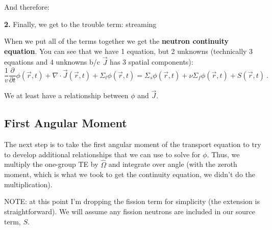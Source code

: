 \documentclass[12pt]{article}
\newif\ifeqns
\newlength{\up}
\newcommand{\vOmega}{\ensuremath{\hat{\Omega}}}
\begin{document}
And therefore:
%
\ifeqns
\begin{align*}
\text{scattering integral }&= \Sigma_s \int_{4\pi} d\vOmega'\: \psi(\vec{r}, \vOmega', t) \\
%
&= \boxed{\Sigma_s \phi(\vec{r}, t)}
\end{align*}
\else
\vspace*{4em}
\fi

\textbf{2.} Finally, we get to the trouble term: streaming
%
\ifeqns
\[\int_{4\pi} d\vOmega \:\vOmega \cdot \nabla \psi(\vec{r}, \vOmega, t) = \nabla \cdot \int_{4\pi} d\vOmega \:\vOmega \psi(\vec{r}, \vOmega, t) = \nabla \cdot \vec{J}(\vec{r}, t)\:. \]
\else
\vspace*{3em}
\fi

\vspace*{2em}
When we put all of the terms together we get the \textbf{neutron continuity equation}. You can see that we have 1 equation, but 2 unknowns (technically 3 equations and 4 unknowns b/c $\vec{J}$ has 3 spatial components):
\begin{equation}
\frac{1}{v}\frac{\partial}{\partial t}\phi(\vec{r}, t) + 
\nabla \cdot \vec{J}(\vec{r}, t) + 
\Sigma_t \phi(\vec{r}, t) =
\Sigma_s \phi(\vec{r}, t) +
\nu \Sigma_f \phi(\vec{r}, t) +
S(\vec{r}, t)\:.
\label{eq:neutroncont}
\end{equation}

We at least have a relationship between $\phi$ and $\vec{J}$.

\subsection*{First Angular Moment}

The next step is to take the first angular moment of the transport equation to try to develop additional relationships that we can use to solve for $\phi$. Thus, we multiply the one-group TE by $\vOmega$ and integrate over angle (with the zeroth moment, which is what we took to get the continuity equation, we didn't do the multiplication). 

NOTE: at this point I'm dropping the fission term for simplicity (the extension is straightforward). We will assume any fission neutrons are included in our source term, $S$. 
\end{document}
